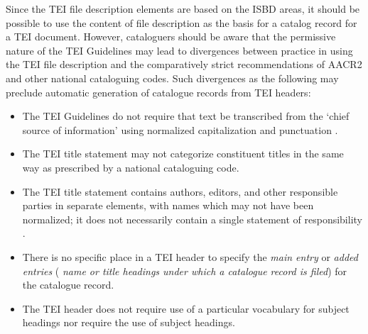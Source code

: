 Since the TEI file description elements are based on the ISBD areas, it should be possible to use the content of file description as the basis for a catalog record for a TEI document. However, cataloguers should be aware that the permissive nature of the TEI Guidelines may lead to divergences between practice in using the TEI file description and the comparatively strict recommendations of AACR2 and other national cataloguing codes. Such divergences as the following may preclude automatic generation of catalogue records from TEI headers: \begin{itemize}
\item The TEI Guidelines do not require that text be transcribed from the ‘chief source of information’ using normalized capitalization and punctuation .
\item The TEI title statement may not categorize constituent titles in the same way as prescribed by a national cataloguing code.
\item The TEI title statement contains authors, editors, and other responsible parties in separate elements, with names which may not have been normalized; it does not necessarily contain a single statement of responsibility .
\item There is no specific place in a TEI header to specify the \textit{main entry} or \textit{added entries} ( \textit{name or title headings under which a catalogue record is filed}) for the catalogue record.
\item The TEI header does not require use of a particular vocabulary for subject headings nor require the use of subject headings.
\end{itemize} 
